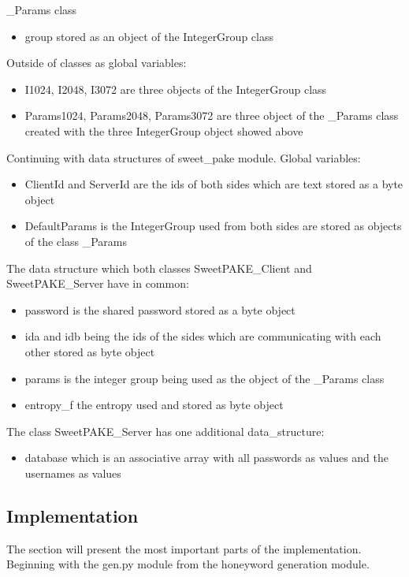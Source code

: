 \documentclass[../main.tex]{subfiles}
\begin{document}
\_Params class
\begin{itemize}
	\item group stored as an object of the IntegerGroup class
\end{itemize}

Outside of classes as global variables:
\begin{itemize}
	\item I1024, I2048, I3072 are three objects of the IntegerGroup class
	\item Params1024, Params2048, Params3072 are three object of the
		\_Params class created with the three IntegerGroup object
		showed above
\end{itemize}

Continuing with data structures of sweet\_pake module. Global variables:
\begin{itemize}
	\item ClientId and ServerId are the ids of both sides which are text
	stored as a byte object 
  	\item DefaultParams is the IntegerGroup used from
		both sides are stored as objects of the class \_Params
\end{itemize}

The data structure which both classes SweetPAKE\_Client and SweetPAKE\_Server have in common:
\begin{itemize}
	\item password is the shared password stored as a byte object 
	\item ida and idb being the ids of the sides which are communicating
		with each other stored as byte object
	\item params is the integer group being used as the object of the \_Params class
	\item entropy\_f the entropy used and stored as byte object
\end{itemize}

The class SweetPAKE\_Server has one additional data\_structure:
\begin{itemize} 
 	\item database which is an associative array with all passwords as
			values and the usernames as values
\end{itemize}

\subsection{Implementation}

The section will present the most important parts of the implementation.
Beginning with the gen.py module from the honeyword generation module. 
\end{document}

